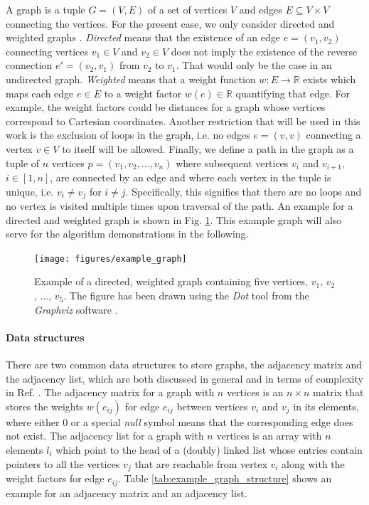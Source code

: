 A graph is a tuple $G = \left(V, E\right)$ of a set of vertices $V$ and edges $E \subseteq V \times V$ 
connecting the vertices. For the present case, we only consider directed and weighted graphs 
\cite[pp. 1-3]{FUH_algo_graphs_2021}.
\textit{Directed} means that the existence of an edge $e = \left(v_1, v_2\right)$ connecting vertices 
$v_1 \in V$ and $v_2 \in V$ does not imply the existence of the reverse connection $e'= \left(v_2, v_1\right)$
from $v_2$ to $v_1$. That would only be the case in an undirected graph.
\textit{Weighted} means that a weight function $w: E \rightarrow \mathbb{R}$ exists which maps each 
edge $e \in E$ to a weight factor $w\left(e\right) \in \mathbb{R}$ quantifying that edge. 
For example, the weight factors could be distances for a graph whose vertices correspond to Cartesian coordinates.
Another restriction that will be used in this work is the exclusion of loops in the graph, i.e.
no edges $e = \left(v, v\right)$ connecting a vertex $v \in V$ to itself will be allowed.
Finally, we define a path in the graph as a tuple of $n$ vertices $p = \left(v_1, v_2, ..., v_n\right)$
where subsequent vertices $v_i$ and $v_{i+1}$, $i \in \left[1, n\right]$, are connected by an edge and 
where each vertex in the tuple is unique, i.e. $v_i \neq v_j$ for $i \neq j$.
Specifically, this signifies that there are no loops and no vertex is visited multiple times upon 
traversal of the path.
An example for a directed and weighted graph is shown in Fig. \ref{fig:example_graph}.
This example graph will also serve for the algorithm demonstrations in the following.

\begin{figure}[h]
	\begin{center}
		\texttt{[image: figures/example\_graph]}
	\end{center}
	\caption[Example graph.]{
		Example of a directed, weighted graph containing five vertices, $v_1$, $v_2$, ..., $v_5$.
		The figure has been drawn using the \textit{Dot} tool from the \textit{Graphviz} software \cite{Ellson2003}.
		\label{fig:example_graph}}
\end{figure}


\paragraph{Data structures}
There are two common data structures to store graphs, the adjacency matrix and the adjacency list, which are
both discussed in general and in terms of complexity in Ref. \cite[pp. 3-5]{FUH_algo_graphs_2021}.
The adjacency matrix for a graph with $n$ vertices is an $n \times n$ matrix that stores the 
weights $w\left(e_{ij}\right)$ for edge $e_{ij}$ between vertices $v_i$ and $v_j$ in its elements,
where either $0$ or a special \textit{null} symbol means that the corresponding edge does not exist.
The adjacency list for a graph with $n$ vertices is an array with $n$ elements $l_i$ which point 
to the head of a (doubly) linked list whose entries contain pointers to all the vertices $v_j$ that are reachable 
from vertex $v_i$ along with the weight factors for edge $e_{ij}$.
Table \ref{tab:example_graph_structure} shows an example for an adjacency matrix and an adjacency list.

